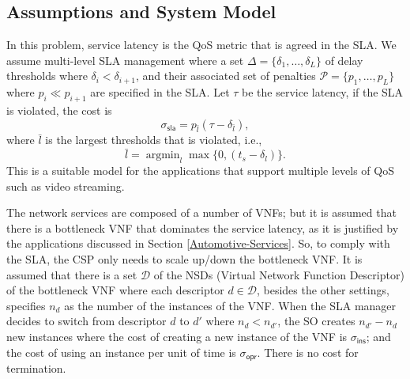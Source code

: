 \documentclass[conference, final]{IEEEtran}
\DeclareMathOperator*{\argmin}{argmin}
\newcommand{\hlb}[2][blue]{{\color{#1} {#2}}\unskip }
\begin{document}
\subsection{Assumptions and System Model}
\label{sec:SLA-Assumption-Model}
\hlb{

In this problem, service latency is the QoS metric that is agreed in the SLA. We assume multi-level SLA management where a set $\Delta=\{\delta_{1},\ldots,\delta_{L}\}$ of delay thresholds where $\delta_{i} < \delta_{i+1}$, and their associated set of penalties $\mathcal{P}=\{p_{1},\ldots,p_{L}\}$ where $p_{i} \ll p_{i+1}$ are specified in the SLA. %
Let $\tau$ be the service latency, if the SLA is violated, the cost is
\begin{equation}
\sigma_{\mathsf{sla}} = p_{\bar{l}}(\tau - \delta_{\bar{l}}),  
\end{equation}
where $\bar{l}$ is the largest thresholds that is violated, i.e., 
\begin{equation*}
\bar{l}=\argmin_{l}\max\{0, (t_{s} - \delta_{l})\}.
\end{equation*}
This is a suitable model for the applications that support multiple levels of QoS such as video streaming.
 
The network services are composed of a number of VNFs; but it is assumed that there is a bottleneck VNF that dominates the service latency, as it is justified by the applications discussed in Section \ref{Automotive-Services}. 
So, to comply with the SLA, the CSP only needs to scale up/down the bottleneck VNF. It is assumed that there is a set $\mathcal{D}$ of the NSDs (Virtual Network Function Descriptor) of the bottleneck VNF where each descriptor $d \in \mathcal{D}$, besides the other settings, specifies $n_{d}$ as the number of the instances of the VNF. When the SLA manager decides to switch from descriptor $d$ to $d'$ where $n_{d} < n_{d'}$, the SO creates $n_{d'} - n_{d}$ new instances where the cost of creating a new instance of the VNF  is $\sigma_{\textsf{ins}}$; and the cost of using an instance per unit of time is $\sigma_{\textsf{opr}}$. There is no cost for termination.

}
\end{document}
